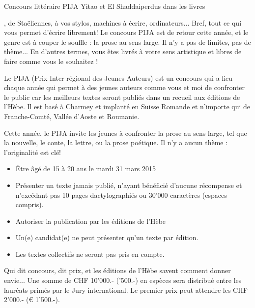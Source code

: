 \begin{article}
{Concours littéraire PIJA}
{Yitao et El Shaddai}{perdus dans les livres}

\begin{spacing}{.9}
, de Staëliennes, à vos stylos, machines à écrire, ordinateurs... Bref, tout ce qui vous permet d'écrire librement! Le concours PIJA est de retour cette année, et le genre est à couper le souffle : la prose au sens large. Il n'y a pas de limites, pas de thème... En d'autres termes, vous êtes livrés à votre sens artistique et libres de faire comme vous le souhaitez !

Le PIJA (Prix Inter-régional des Jeunes Auteurs) est un concours qui a lieu chaque année qui permet à des jeunes auteurs comme vous et moi de confronter le public car les meilleurs textes seront publiés dans un recueil aux éditions de l'Hèbe. Il est basé à Charmey et implanté en Suisse Romande et n'importe qui de Franche-Comté, Vallée d'Aoste et Roumanie.

Cette année, le PIJA invite les jeunes à confronter la prose au sens large, tel que la nouvelle, le conte, la lettre, ou la prose poétique. Il n'y a aucun thème : l'originalité est clé!

\vspace*{-.8\baselineskip}\begin{itemize}[leftmargin=0cm,itemindent=.5cm]
	\item Être âgé de 15 à 20 ans le mardi 31 mars 2015
	\item Présenter un texte jamais publié, n’ayant bénéficié d’aucune récompense et n’excédant pas 10 pages dactylographiés ou 30'000 caractères (espaces compris).
	\item Autoriser la publication par les éditions de l’Hèbe
	\item Un(e) candidat(e) ne peut présenter qu’un texte par édition.
	\item Les textes collectifs ne seront pas pris en compte.
\end{itemize}\vspace*{.5\baselineskip}

Qui dit concours, dit prix, et les éditions de l'Hèbe savent comment donner envie... Une somme de CHF 10'000.- ('500.-) en espèces sera distribué entre les lauréats primés par le Jury international. Le premier prix peut attendre les CHF 2'000.- (€ 1'500.-).


\end{spacing}
\end{article}
